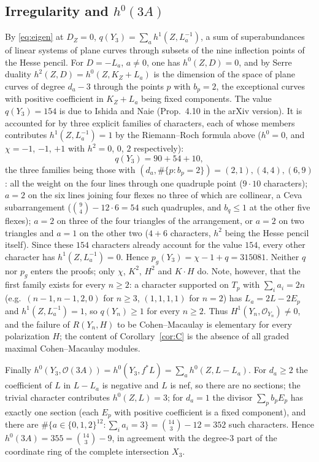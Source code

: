 \documentclass[11pt]{amsart}
\theoremstyle{remark}
\theoremstyle{definition}
\newcommand{\cO}{\mathcal{O}}
\begin{document}
\subsection*{Irregularity and \texorpdfstring{$h^0(3A)$}{h0(3A)}}
By \eqref{eq:eigen} at $D_Z=0$, $q(Y_3)=\sum_ah^1(Z,L_a^{-1})$, a sum of superabundances of linear systems of plane curves through subsets of the nine inflection points of the Hesse pencil. For $D=-L_a$, $a\ne0$, one has $h^0(Z,D)=0$, and by Serre duality $h^2(Z,D)=h^0(Z,K_Z+L_a)$ is the dimension of the space of plane curves of degree $d_a-3$ through the points $p$ with $b_p=2$, the exceptional curves with positive coefficient in $K_Z+L_a$ being fixed components. The value $q(Y_3)=154$ is due to Ishida \cite{Is} and Naie \cite[Prop.~5.9]{Na} (Prop.~4.10 in the arXiv version).
It is accounted for by three explicit families of characters, each of whose members contributes $h^1(Z,L_a^{-1})=1$ by the Riemann--Roch formula above ($h^0=0$, and $\chi=-1$, $-1$, $+1$ with $h^2=0$, $0$, $2$ respectively):
\[
q(Y_3)=90+54+10,
\]
the three families being those with $(d_a,\#\{p:b_p=2\})=(2,1),(4,4),(6,9)$: all the weight on the four lines through one quadruple point ($9\cdot10$ characters); $a=2$ on the six lines joining four flexes no three of which are collinear, a Ceva subarrangement ($\binom94-12\cdot6=54$ such quadruples, and $b_q\le1$ at the other five flexes); $a=2$ on three of the four triangles of the arrangement, or $a=2$ on two triangles and $a=1$ on the other two ($4+6$ characters, $h^2$ being the Hesse pencil itself). Since these $154$ characters already account for the value $154$, every other character has $h^1(Z,L_a^{-1})=0$.
Hence $p_g(Y_3)=\chi-1+q=315081$. Neither $q$ nor $p_g$ enters the proofs; only $\chi$, $K^2$, $H^2$ and $K\cdot H$ do. Note, however, that the first family exists for every $n\ge2$: a character supported on $T_p$ with $\sum_ia_i=2n$ (e.g.\ $(n-1,n-1,2,0)$ for $n\ge3$, $(1,1,1,1)$ for $n=2$) has $L_a=2L-2E_p$ and $h^1(Z,L_a^{-1})=1$, so $q(Y_n)\ge1$ for every $n\ge2$. Thus $H^1(Y_n,\cO_{Y_n})\ne0$, and the failure of $R(Y_n,H)$ to be Cohen--Macaulay is elementary for every polarization $H$; the content of Corollary~\ref{cor:C} is the absence of all graded maximal Cohen--Macaulay modules.

Finally $h^0(Y_3,\cO(3A))=h^0(Y_3,f^*L)=\sum_ah^0(Z,L-L_a)$. For $d_a\ge2$ the coefficient of $L$ in $L-L_a$ is negative and $L$ is nef, so there are no sections; the trivial character contributes $h^0(Z,L)=3$; for $d_a=1$ the divisor $\sum_pb_pE_p$ has exactly one section (each $E_p$ with positive coefficient is a fixed component), and there are $\#\{a\in\{0,1,2\}^{12}:\sum_ia_i=3\}=\binom{14}{3}-12=352$ such characters. Hence $h^0(3A)=355=\binom{14}{3}-9$, in agreement with the degree-$3$ part of the coordinate ring of the complete intersection $X_3$.
\end{document}
